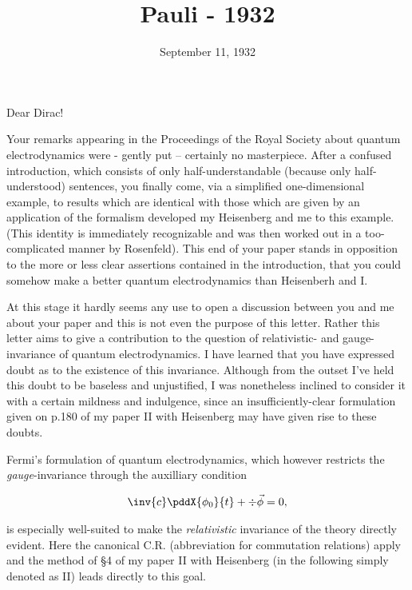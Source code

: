\documentclass{article}
\title{Pauli - 1932}
\newcommand{\uequ}[1]{
\begin{align*}
#1
\end{align*}
}
\begin{document}
\date{September 11, 1932}

Dear Dirac!

Your remarks appearing in the Proceedings of the Royal Society about quantum electrodynamics were - gently put -- certainly no masterpiece. After a confused introduction, which consists of only half-understandable (because only half-understood) sentences, you finally come, via a simplified one-dimensional example, to results which are identical with those which are given by an application of the formalism developed my Heisenberg and me to this example. (This identity is immediately recognizable and was then worked out in a too-complicated manner by Rosenfeld). This end of your paper stands in opposition to the more or less clear assertions contained in the introduction, that you could somehow make a better quantum electrodynamics than Heisenberh and I.

At this stage it hardly seems any use to open a discussion between you and me about your paper and this is not even the purpose of this letter. Rather this letter aims to give a contribution to the question of relativistic- and gauge-invariance of quantum electrodynamics. I have learned that you have expressed doubt as to the existence of this invariance. Although from the outset I've held this doubt to be baseless and unjustified, I was nonetheless inclined to consider it with a certain mildness and indulgence, since an insufficiently-clear formulation given on p.180 of my paper II with Heisenberg may have given rise to these doubts.

Fermi's formulation of quantum electrodynamics, which however restricts the \textit{gauge}-invariance through the auxilliary condition
\uequ{
\inv{c}\pddX{\phi_0}{t} + \div{\vec{\phi}} = 0,
}
is especially well-suited to make the \textit{relativistic} invariance of the theory directly evident. Here the canonical C.R. (abbreviation for commutation relations) apply and the method of §4 of my paper II with Heisenberg (in the following simply denoted as II) leads directly to this goal.
\end{document}
